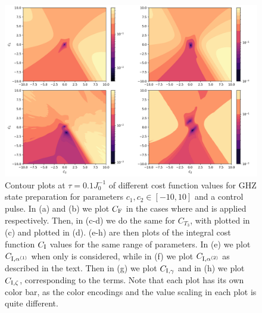 \begin{figure}[t]
    \centering
    \includegraphics[width=0.8\linewidth]{images/final_plot_int_nogrape.png} \caption[Contour plots of cost function landscapes for GHZ state preparation in frustrated spin systems (maximum amplitude cost function) using a bare optimisation pulse.]{Contour plots at $\tau = 0.1 J_0^{-1}$ of different cost function values for GHZ state preparation for parameters $c_1, c_2 \in [-10,10]$ and a  control pulse. In (a) and (b) we plot $C_{\rm F}$ in the cases where  and   is applied respectively. Then, in (c-d) we do the same for $C_{T_3}$, with   plotted in (c) and   plotted in (d). (e-h) are then plots of the integral cost function $C_{\rm I}$ values for the same range of parameters. In (e) we plot $C_{\rm I, \alpha^{(1)}}$ when only   is considered, while in (f) we plot $C_{\rm I, \alpha^{(2)}}$ as described in the text. Then in (g) we plot $C_{\rm I, \gamma}$ and in (h) we plot $C_{\rm I, \zeta}$, corresponding to the  terms. Note that each plot has its own color bar, as the color encodings and the value scaling in each plot is quite different.}\label{fig:ghz_contours_int_noGRAPE}
\end{figure}
